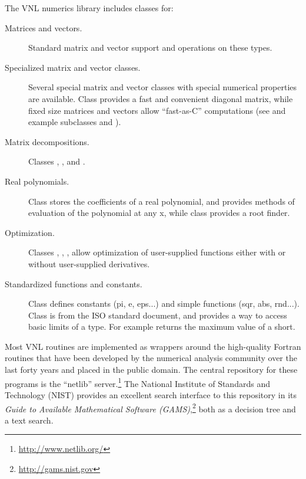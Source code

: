 The VNL numerics library includes classes for:
\begin{description}
    \item[Matrices and vectors.] Standard matrix and vector support
    and operations on these types.

    \item[Specialized matrix and vector classes.] Several special matrix
    and vector classes with special numerical properties are
    available. Class  provides a fast and
    convenient diagonal matrix, while fixed size matrices and vectors
    allow ``fast-as-C'' computations (see 
    and example subclasses  and
    ).

    \item[Matrix decompositions.] Classes ,
    , and
    .

    \item[Real polynomials.] Class  stores
    the coefficients of a real polynomial, and provides methods of
    evaluation of the polynomial at any x, while class
     provides a root finder.

    \item[Optimization.] Classes ,
    , ,
     allow optimization of user-supplied
    functions either with or without user-supplied derivatives.

    \item[Standardized functions and constants.] Class 
    defines constants (pi, e, eps...) and simple functions (sqr, abs,
    rnd...). Class  is from the ISO standard
    document, and provides a way to access basic limits of a
    type. For example  returns the maximum
    value of a short.
\end{description}

Most VNL routines are implemented as wrappers around the high-quality Fortran
routines that have been developed by the numerical analysis community over
the last forty years and placed in the public domain. The central repository
for these programs is the ``netlib'' server.\footnote{\url{http://www.netlib.org/}} The
National Institute of Standards and Technology (NIST) provides an excellent
search interface to this repository in its \emph{Guide to Available Mathematical
Software (GAMS)},\footnote{\url{http://gams.nist.gov}} both as a decision tree and a
text search.

